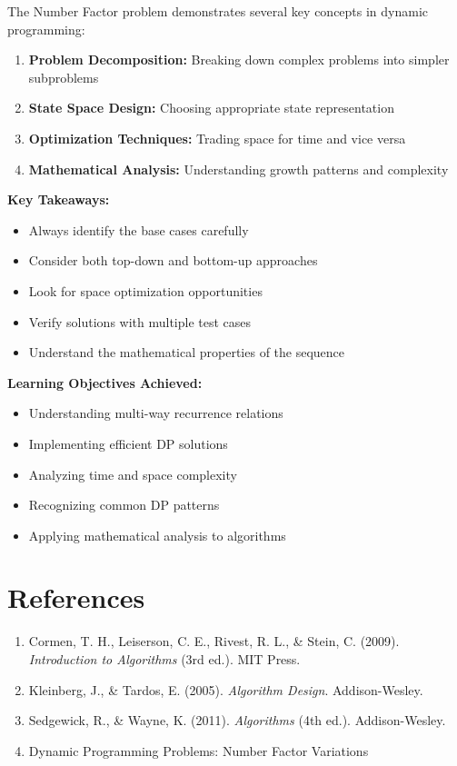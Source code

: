 \documentclass[12pt,a4paper]{article}
\begin{document}
The Number Factor problem demonstrates several key concepts in dynamic programming:

\begin{enumerate}
\item \textbf{Problem Decomposition:} Breaking down complex problems into simpler subproblems
\item \textbf{State Space Design:} Choosing appropriate state representation
\item \textbf{Optimization Techniques:} Trading space for time and vice versa
\item \textbf{Mathematical Analysis:} Understanding growth patterns and complexity
\end{enumerate}

\textbf{Key Takeaways:}
\begin{itemize}
\item Always identify the base cases carefully
\item Consider both top-down and bottom-up approaches
\item Look for space optimization opportunities
\item Verify solutions with multiple test cases
\item Understand the mathematical properties of the sequence
\end{itemize}

\textbf{Learning Objectives Achieved:}
\begin{itemize}
\item Understanding multi-way recurrence relations
\item Implementing efficient DP solutions
\item Analyzing time and space complexity
\item Recognizing common DP patterns
\item Applying mathematical analysis to algorithms
\end{itemize}

\section{References}

\begin{enumerate}
\item Cormen, T. H., Leiserson, C. E., Rivest, R. L., \& Stein, C. (2009). \textit{Introduction to Algorithms} (3rd ed.). MIT Press.
\item Kleinberg, J., \& Tardos, E. (2005). \textit{Algorithm Design}. Addison-Wesley.
\item Sedgewick, R., \& Wayne, K. (2011). \textit{Algorithms} (4th ed.). Addison-Wesley.
\item Dynamic Programming Problems: Number Factor Variations
\end{enumerate}
\end{document}
